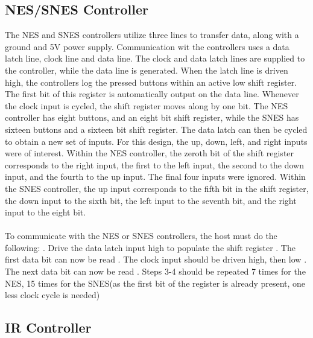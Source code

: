 \documentclass[]{article}
\begin{document}
\subsection{NES/SNES Controller}
The NES and SNES controllers utilize three lines to transfer data, along with a ground and 5V power supply. Communication wit the controllers uses a data latch line, clock line and data line. The clock and data latch lines are supplied to the controller, while the data line is generated. When the latch line is driven high, the controllers log the pressed buttons within an active low shift register. The first bit of this register is automatically output on the data line. Whenever the clock input is cycled, the shift register moves along by one bit. The NES controller has eight buttons, and an eight bit shift register, while the SNES has sixteen buttons and a sixteen bit shift register. The data latch can then be cycled to obtain a new set of inputs. For this design, the up, down, left, and right inputs were of interest. Within the NES controller, the zeroth bit of the shift register corresponds to the right input, the first to  the left input, the second to the down input, and the fourth to the up input. The final four inputs were ignored. Within the SNES controller, the up input corresponds to the fifth bit in the shift register, the down input to the sixth bit, the left input to the seventh bit, and the right input to the eight bit. \\~\\
To communicate with the NES or SNES controllers, the host must do the following:
. Drive the data latch input high to populate the shift register
. The first data bit can now be read
. The clock input should be driven high, then low
. The next data bit can now be read
. Steps 3-4 should be repeated 7 times for the NES, 15 times for the SNES(as the first bit of the register is already present, one less clock cycle is needed)
\subsection{IR Controller}
\end{document}
